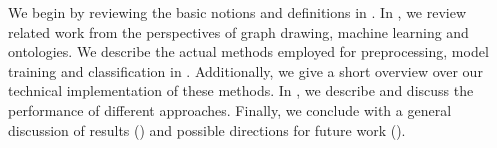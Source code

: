 \documentclass[
	fontsize=10pt, %
	twoside=false, %
	secnumdepth=1, %
  toc=indentunnumbered %
]{kaobook}
\begin{document}




We begin by reviewing the basic notions and definitions in
. In , we review related work from the
perspectives of graph drawing, machine learning and ontologies.
We describe the actual methods employed for preprocessing, model training and
classification in . Additionally, we give a short overview over
our technical implementation of these methods. In ,
we describe and discuss the performance of different approaches. Finally, we
conclude with a general discussion of results () and
possible directions for future work ().









\end{document}
